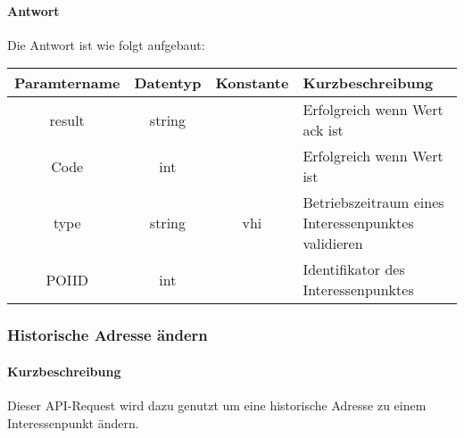 \paragraph{Antwort}Die Antwort ist wie folgt aufgebaut:
\begin{table}[H]
	\begin{tabular}{|c|c|c|p{6.5cm}|}
		\hline
		\textbf{Paramtername} & \textbf{Datentyp} & \textbf{Konstante} & \textbf{Kurzbeschreibung}                                                                                               \\ \hline
		result              & string           &                 & Erfolgreich wenn Wert {\glqq ack\grqq} ist \\ \hline
		Code                & int              &                 & Erfolgreich wenn Wert {\glqq 0\grqq} ist \\ \hline
		type                & string           & vhi             & Betriebszeitraum eines Interessenpunktes validieren \\ \hline
		POIID               & int              &                 & Identifikator des Interessenpunktes \\ \hline
	\end{tabular}
\end{table}

\subsubsection{Historische Adresse ändern}
\paragraph{Kurzbeschreibung}Dieser API-Request wird dazu genutzt um eine historische Adresse zu einem Interessenpunkt ändern.

